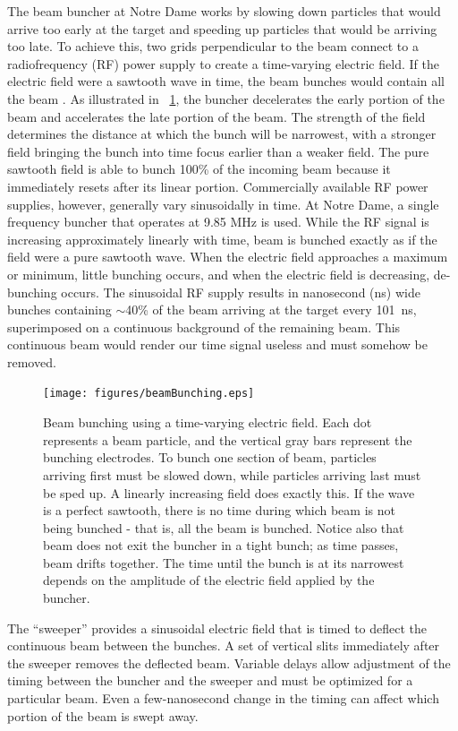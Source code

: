 The beam buncher at Notre Dame works by slowing down particles that would arrive too early at the target and speeding up particles that would be arriving too late.  To achieve this, two grids perpendicular to the beam connect to a radiofrequency (RF) power supply to create a time-varying electric field.  If the electric field were a sawtooth wave in time, the beam bunches would contain all the beam \cite{LynchBunching}.  As illustrated in \fig~\ref{fig:bunching}, the buncher decelerates the early portion of the beam and accelerates the late portion of the beam.  The strength of the field determines the distance at which the bunch will be narrowest, with a stronger field bringing the bunch into time focus earlier than a weaker field.  The pure sawtooth field is able to bunch 100\% of the incoming beam because it immediately resets after its linear portion.  Commercially available RF power supplies, however, generally vary sinusoidally in time.  At Notre Dame, a single frequency buncher that operates at 9.85 MHz is used.  While the RF signal is increasing approximately linearly with time, beam is bunched exactly as if the field were a pure sawtooth wave.  When the electric field approaches a maximum or minimum, little bunching occurs, and when the electric field is decreasing, de-bunching occurs.  The sinusoidal RF supply results in nanosecond (ns) wide bunches containing $\sim$40\% of the beam arriving at the target every 101~ns, superimposed on a continuous background of the remaining beam.  This continuous beam would render our time signal useless and must somehow be removed.

\begin{figure}[htp]
\centering
\texttt{[image: figures/beamBunching.eps]}
\label{fig:bunching}
\caption{Beam bunching using a time-varying electric field.  Each dot represents a beam particle, and the vertical gray bars represent the bunching electrodes.  To bunch one section of beam, particles arriving first must be slowed down, while particles arriving last must be sped up.  A linearly increasing field does exactly this.  If the wave is a perfect sawtooth, there is no time during which beam is not being bunched - that is, all the beam is bunched.  Notice also that beam does not exit the buncher in a tight bunch; as time passes, beam drifts together.  The time until the bunch is at its narrowest depends on the amplitude of the electric field applied by the buncher.}
\end{figure}

The ``sweeper'' provides a sinusoidal electric field that is timed to deflect the continuous beam between the bunches.  A set of vertical slits immediately after the sweeper removes the deflected beam.  Variable delays allow adjustment of the timing between the buncher and the sweeper and must be optimized for a particular beam.  Even a few-nanosecond change in the timing can affect which portion of the beam is swept away. 

